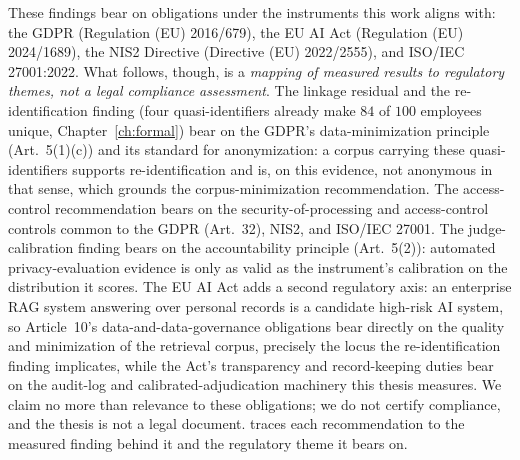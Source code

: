 \documentclass[12pt,a4paper]{report}
\begin{document}
These findings bear on obligations under the instruments this work aligns with: the GDPR
(Regulation (EU) 2016/679), the EU AI Act (Regulation (EU) 2024/1689), the NIS2 Directive (Directive
(EU) 2022/2555), and ISO/IEC 27001:2022.
What follows, though, is a \emph{mapping of measured results to regulatory themes, not a legal compliance
assessment}. The linkage residual and the re-identification finding (four quasi-identifiers already make
$84$ of $100$ employees unique, Chapter~\ref{ch:formal}) bear on the GDPR's data-minimization principle
(Art.\ 5(1)(c)) and its standard for anonymization: a corpus carrying these quasi-identifiers supports
re-identification and is, on this evidence, not anonymous in that sense, which grounds the
corpus-minimization recommendation. The access-control recommendation bears on the security-of-processing
and access-control controls common to the GDPR (Art.\ 32), NIS2, and ISO/IEC 27001. The judge-calibration
finding bears on the accountability principle (Art.\ 5(2)): automated privacy-evaluation evidence is only
as valid as the instrument's calibration on the distribution it scores. The EU AI Act adds a second
regulatory axis: an enterprise RAG system answering over personal records is a candidate high-risk AI
system, so Article~10's data-and-data-governance obligations bear directly on the quality and
minimization of the retrieval corpus, precisely the locus the re-identification finding implicates,
while the Act's transparency and record-keeping duties bear on the audit-log and calibrated-adjudication
machinery this thesis measures. We claim no more than relevance to
these obligations; we do not certify compliance, and the thesis is not a legal document.  traces each recommendation to the measured finding behind it and the regulatory theme it bears on.
\end{document}

